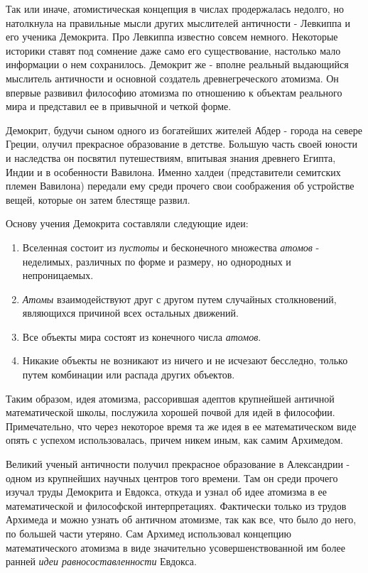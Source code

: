 Так или иначе, атомистическая концепция в числах продержалась недолго, но натолкнула на правильные мысли других мыслителей античности - Левкиппа и его ученика Демокрита.
Про Левкиппа известно совсем немного.
Некоторые историки ставят под сомнение даже само его существование, настолько мало информации о нем сохранилось.
Демокрит же - вполне реальный выдающийся мыслитель античности и основной создатель древнегреческого атомизма. 
Он впервые развивил философию атомизма по отношению к объектам реального мира и представил ее в привычной и четкой форме.

Демокрит, будучи сыном одного из богатейших жителей Абдер - города на севере Греции, олучил прекрасное образование в детстве.
Большую часть своей юности и наследства он посвятил путешествиям, впитывая знания древнего Египта, Индии и в особенности Вавилона.
Именно халдеи (представители семитских племен Вавилона) передали ему среди прочего свои соображения об устройстве вещей, которые он затем блестяще развил.

Основу учения Демокрита составляли следующие идеи:
\begin{enumerate}
    \item Вселенная состоит из \textit{пустоты} и бесконечного множества \textit{атомов} - неделимых, различных по форме и размеру, но однородных и непроницаемых.
    \item \textit{Атомы} взаимодействуют друг с другом путем случайных столкновений, являющихся причиной всех остальных движений. 
    \item Все объекты мира состоят из конечного числа \textit{атомов}.
    \item Никакие объекты не возникают из ничего и не исчезают бесследно, только путем комбинации или распада других объектов.
\end{enumerate} 

Таким образом, идея атомизма, рассорившая адептов крупнейшей античной математической школы, послужила хорошей почвой для идей в философии. 
Примечательно, что через некоторое время та же идея в ее математическом виде опять с успехом использовалась, причем никем иным, как самим Архимедом.

Великий ученый античности получил прекрасное образование в Александрии - одном из крупнейших научных центров того времени. 
Там он среди прочего изучал труды Демокрита и Евдокса, откуда и узнал об идее атомизма в ее математической и философской интерпретациях.
Фактически только из трудов Архимеда и можно узнать об античном атомизме, так как все, что было до него, по большей части утеряно.
Сам Архимед использовал концепцию математического атомизма в виде значительно усовершенствованной им более ранней \textit{идеи равносоставленности} Евдокса.

